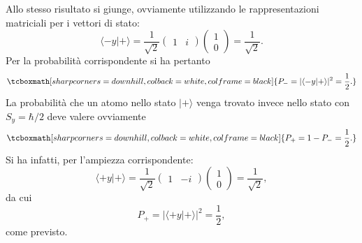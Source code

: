 Allo stesso risultato si giunge, ovviamente utilizzando le rappresentazioni matriciali per i vettori di stato:
	\begin{equation}
		\langle -y | + \rangle= \frac{1}{\sqrt{2}}
		\begin{pmatrix}
		1 & i
		\end{pmatrix}
		\begin{pmatrix}
		1 \\
		0
		\end{pmatrix}=
		\frac{1}{\sqrt{2}} .
	\end{equation}
Per la probabilità corrispondente si ha pertanto
	\begin{equation}
		\tcboxmath[sharp corners=downhill, colback=white, colframe=black]{
			P_-= |\langle -y | + \rangle |^2=\frac{1}{2} .
			}
	\end{equation}
La probabilità che un atomo nello stato $| + \rangle $  venga trovato invece nello stato con $S_y=\hbar/2$ deve valere ovviamente
	\begin{equation}
		\tcboxmath[sharp corners=downhill, colback=white, colframe=black]{
			P_+= 1-P_-=\frac{1}{2} .
			}
	\end{equation}
Si ha infatti, per l'ampiezza corrispondente:
	\begin{equation}
		\langle +y | + \rangle = \frac{1}{\sqrt{2}}
		\begin{pmatrix}
		1 & -i
		\end{pmatrix}
		\begin{pmatrix}
		1 \\
		0
		\end{pmatrix}=
		\frac{1}{\sqrt{2}} ,
	\end{equation}
da cui
	\begin{equation}
		P_+= |\langle +y | + \rangle |^2=\frac{1}{2} ,
		\end{equation}
come previsto.\\

